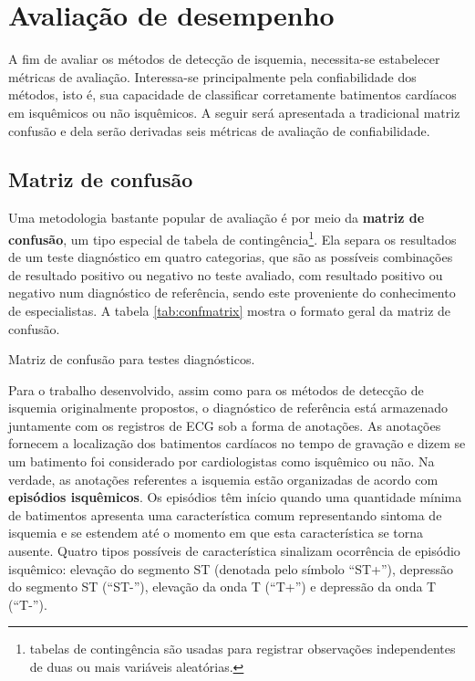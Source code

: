 
\chapter[Avaliação de desempenho]{Avaliação de desempenho}
\thispagestyle{empty}
\label{chap:chapter4}
A fim de avaliar os métodos de detecção de isquemia, necessita-se estabelecer métricas de avaliação. Interessa-se principalmente pela confiabilidade dos métodos, isto é, sua capacidade de classificar corretamente batimentos cardíacos em isquêmicos ou não isquêmicos. A seguir será apresentada a tradicional matriz confusão e dela serão derivadas seis métricas de avaliação de confiabilidade.

\section{Matriz de confusão}
Uma metodologia bastante popular de avaliação é por meio da \textbf{matriz de confusão}, um tipo especial de tabela de contingência\footnote{tabelas de contingência são usadas para registrar observações independentes de duas ou mais variáveis aleatórias.}. Ela separa os resultados de um teste diagnóstico em quatro categorias, que são as possíveis combinações de resultado positivo ou negativo no teste avaliado, com resultado positivo ou negativo num diagnóstico de referência, sendo este proveniente do conhecimento de especialistas. A tabela \ref{tab:confmatrix} mostra o formato geral da matriz de confusão.

\begin{table}[ht!]
    \centering
    
    \caption[Matriz de confusão para testes diagnósticos]{Matriz de confusão para testes diagnósticos.}
    \label{tab:confmatrix}
\end{table}

Para o trabalho desenvolvido, assim como para os métodos de detecção de isquemia originalmente propostos, o diagnóstico de referência está armazenado juntamente com os registros de ECG sob a forma de anotações. As anotações fornecem a localização dos batimentos cardíacos no tempo de gravação e dizem se um batimento foi considerado por cardiologistas como isquêmico ou não. Na verdade, as anotações referentes a isquemia estão organizadas de acordo com \textbf{episódios isquêmicos}. Os episódios têm início quando uma quantidade mínima de batimentos apresenta uma característica comum representando sintoma de isquemia e se estendem até o momento em que esta característica se torna ausente. Quatro tipos possíveis de característica sinalizam ocorrência de episódio isquêmico: elevação do segmento ST (denotada pelo símbolo ``ST+''), depressão do segmento ST (``ST-''), elevação da onda T (``T+'') e depressão da onda T (``T-'').

